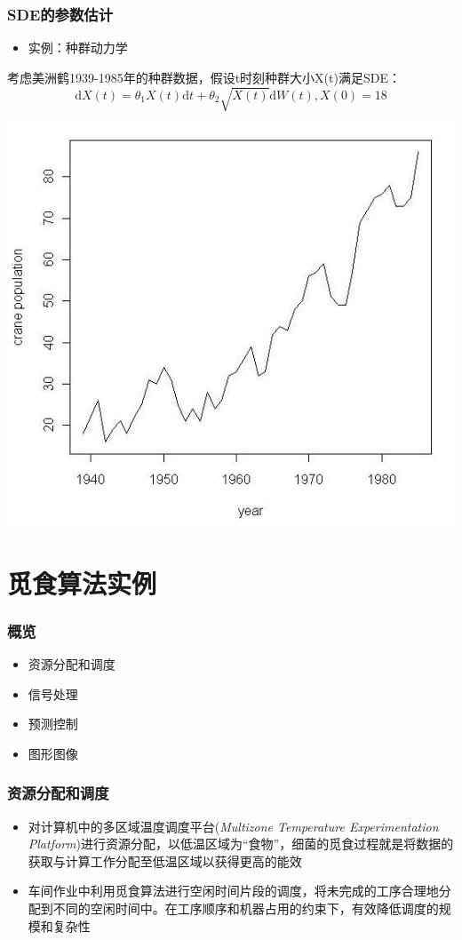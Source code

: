 \documentclass{beamer}
\begin{document}
\begin{frame}

\frametitle{SDE的参数估计}
\begin{itemize}
\item 实例：种群动力学
\end{itemize}

考虑美洲鹤1939-1985年的种群数据，假设t时刻种群大小X(t)满足SDE：$$\mathrm{d}X(t) = \theta_1X(t)\mathrm{d}t + \theta_2\sqrt{X(t)}\mathrm{d}W(t), X(0) = 18$$

\begin{center}
\includegraphics[width = .6\textwidth]{goose.png}
\end{center}

\end{frame}

%
\section{觅食算法实例}
\begin{frame}
\frametitle{概览}
\begin{itemize}
\item 资源分配和调度
\item 信号处理
\item 预测控制
\item 图形图像
\end{itemize}
\end{frame}

\begin{frame}
\frametitle{资源分配和调度}
\begin{itemize}
\item 对计算机中的多区域温度调度平台(\textit{Multizone Temperature Experimentation Platform})进行资源分配，以低温区域为“食物”，细菌的觅食过程就是将数据的获取与计算工作分配至低温区域以获得更高的能效
\item 车间作业中利用觅食算法进行空闲时间片段的调度，将未完成的工序合理地分配到不同的空闲时间中。在工序顺序和机器占用的约束下，有效降低调度的规模和复杂性
\end{itemize}
\end{frame}
\end{document}
